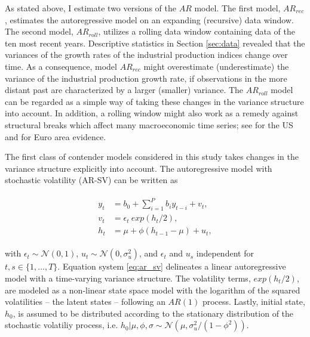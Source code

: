 \documentclass[12pt,letterpaper,fleqn]{article}           %
\begin{document}
As stated above, I estimate two versions of the $AR$ model. The first model, $AR_{rec}$, estimates the autoregressive model on an expanding (recursive) data window. The second model, $AR_{roll}$, utilizes a rolling data window containing data of the ten most recent years. Descriptive statistics in Section \ref{sec:data} revealed that the variances of the growth rates of the industrial production indices change over time. As a consequence, model $AR_{rec}$ might overestimate (underestimate) the variance of the industrial production growth rate, if observations in the more distant past are characterized by a larger (smaller) variance. The $AR_{roll}$ model can be regarded as a simple way of taking these changes in the variance structure into account. In addition, a rolling window might also work as a remedy against structural breaks which affect many macroeconomic time series; see \textcite{stock96} for the US and \textcite{marc02} for Euro area evidence.


The first class of contender models considered in this study takes changes in the variance structure explicitly into account. The autoregressive model with stochastic volatility (AR-SV) can be written as

\begin{align}
\begin{split}
y_t &= b_0 + \sum_{i=1}^P b_i y_{t-i} + v_t, \\
v_t &= \epsilon_t\ exp(h_t / 2), \\
h_t &= \mu + \phi(h_{t-1} - \mu) + u_t,
\label{eq:ar_sv}
\end{split}
\end{align}

with $\epsilon_t \sim \mathcal{N}(0, 1)$, $u_t \sim \mathcal{N}(0, \sigma_u^2)$, and $\epsilon_t$ and $u_s$ independent for $t,s \in \{1,\ldots,T\}$. Equation system \eqref{eq:ar_sv} delineates a linear autoregressive model with a time-varying variance structure. The volatility terms, $exp(h_t / 2)$, are modeled as a non-linear state space model with the logarithm of the squared volatilities -- the latent states -- following  an $AR(1)$ process. Lastly, initial state, $h_0$, is assumed to be distributed according to the stationary distribution of the stochastic volatiliy process, i.e. $h_0|\mu, \phi, \sigma \sim \mathcal{N}(\mu, \sigma_u^2 / (1 - \phi^2))$.
\end{document}
